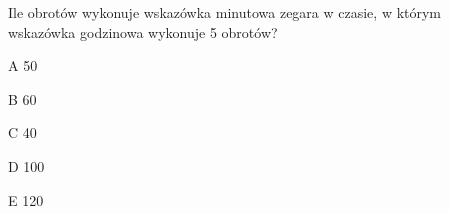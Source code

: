 \begin{tresc}
Ile obrotów wykonuje wskazówka minutowa zegara w czasie, w którym wskazówka godzinowa wykonuje 5 obrotów?
\end{tresc}
\begin{wariant}{A} 50 \end{wariant}
\begin{wariant}{B} 60 \end{wariant}
\begin{wariant}{C} 40 \end{wariant}
\begin{wariant}{D} 100 \end{wariant}
\begin{wariant}{E} 120 \end{wariant}
